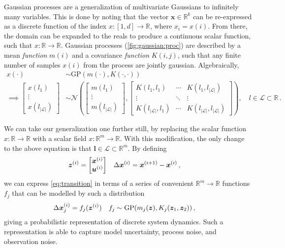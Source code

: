 \documentclass[main.tex]{subfiles}
\begin{document}
	Gaussian processes are a generalization of multivariate Gaussians to infinitely many variables.
	This is done by noting that the vector $\mathbf{x} \in \mathbb{R}^k$ can be re-expressed as a discrete function of the index $x\colon [1,d] \to \mathbb{R}$, where $x_i = x(i)$.
	From there, the domain can be expanded to the reals to produce a continuous scalar function, such that $x\colon \mathbb{R} \to \mathbb{R}$.
	Gaussian processes (\cref{fig:gaussian:proc}) are described by a mean \emph{function} $m(i)$ and a covariance \emph{function} $K(i, j)$, such that any finite number of samples $x(i)$ from the process are jointly gaussian. Algebraically,
	\begin{align}
		x(\cdot) &\sim \mathrm{GP}(m(\cdot), K(\cdot,\cdot)) \\
		\implies
		\begin{bmatrix}
			x(l_1) \\
			\vdots \\
			x(l_{|\mathcal{L}|})
		\end{bmatrix} &\sim \mathcal{N}\left(\begin{bmatrix}
			m(l_1) \\
			\vdots \\
			m(l_{|\mathcal{L}|})
		\end{bmatrix}, \begin{bmatrix}
			K(l_1,l_1) & \cdots & K(l_1,l_{|\mathcal{L}|}) \\
			\vdots & \ddots & \vdots \\
			K(l_{|\mathcal{L}|},l_1) & \cdots & K(l_{|\mathcal{L}|},l_{|\mathcal{L}|})
		\end{bmatrix}\right), \quad l \in \mathcal{L} \subset \mathbb{R}\,.
	\end{align}

	We can take our generalization one further still, by replacing the scalar function $x\colon \mathbb{R} \to \mathbb{R}$ with a scalar field $x\colon \mathbb{R}^m \to \mathbb{R}$.
	With this modification, the only change to the above equation is that $\bm{l} \in \mathcal{L} \subset \mathbb{R}^m$.
	By defining
	\begin{align}
		\bm{z}^{(i)} &= \begin{bmatrix}\bm{x}^{(i)} \\ \bm{u}^{(i)}\end{bmatrix} &
		\Delta\bm{x}^{(i)} &= \bm{x}^{(i + 1)} - \bm{x}^{(i)}\,,
	\end{align}
	we can express \cref{eq:transition} in terms of a series of convenient $\mathbb{R}^m \to \mathbb{R}$ functions $f_j$ that can be modelled by such a distribution
	\begin{align}
		\Delta\bm{x}^{(i)}_j &= f_j(\bm{z}^{(i)}) & f_j &\sim \mathrm{GP}(m_j(\bm{z}), K_j(\bm{z}_1, \bm{z}_2))\,, \label{eq:transition-gp}
	\end{align}
	giving a probabilistic representation of discrete system dynamics.
	Such a representation is able to capture model uncertainty, process noise, and observation noise.
\end{document}
